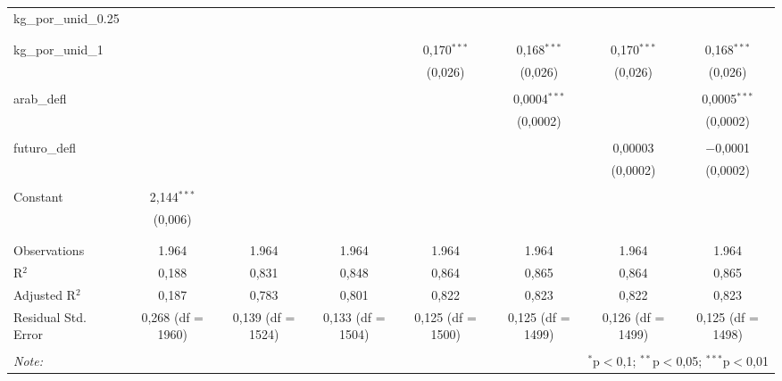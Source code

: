 \begin{table}[!htbp]
\begin{tabular}{@{\extracolsep{5pt}}lccccccc}
 kg\_por\_unid\_0.25 &  &  &  &  &  &  &  \\ 
  &  &  &  &  &  &  &  \\ 
  & & & & & & & \\ 
 kg\_por\_unid\_1 &  &  &  & 0,170$^{***}$ & 0,168$^{***}$ & 0,170$^{***}$ & 0,168$^{***}$ \\ 
  &  &  &  & (0,026) & (0,026) & (0,026) & (0,026) \\ 
  & & & & & & & \\ 
 arab\_defl &  &  &  &  & 0,0004$^{***}$ &  & 0,0005$^{***}$ \\ 
  &  &  &  &  & (0,0002) &  & (0,0002) \\ 
  & & & & & & & \\ 
 futuro\_defl &  &  &  &  &  & 0,00003 & $-$0,0001 \\ 
  &  &  &  &  &  & (0,0002) & (0,0002) \\ 
  & & & & & & & \\ 
 Constant & 2,144$^{***}$ &  &  &  &  &  &  \\ 
  & (0,006) &  &  &  &  &  &  \\ 
  & & & & & & & \\ 
\hline \\[-1.8ex] 
Observations & 1.964 & 1.964 & 1.964 & 1.964 & 1.964 & 1.964 & 1.964 \\ 
R$^{2}$ & 0,188 & 0,831 & 0,848 & 0,864 & 0,865 & 0,864 & 0,865 \\ 
Adjusted R$^{2}$ & 0,187 & 0,783 & 0,801 & 0,822 & 0,823 & 0,822 & 0,823 \\ 
Residual Std. Error & 0,268 (df = 1960) & 0,139 (df = 1524) & 0,133 (df = 1504) & 0,125 (df = 1500) & 0,125 (df = 1499) & 0,126 (df = 1499) & 0,125 (df = 1498) \\ 
\hline 
\hline \\[-1.8ex] 
\textit{Note:}  & \multicolumn{7}{r}{$^{*}$p$<$0,1; $^{**}$p$<$0,05; $^{***}$p$<$0,01} \\ 
\end{tabular} 
\end{table} 
